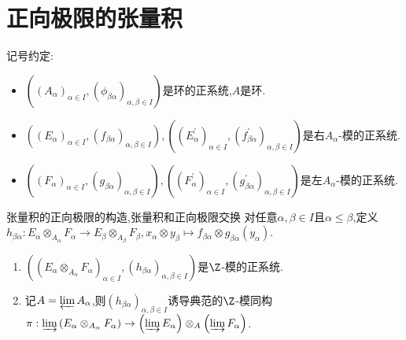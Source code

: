 \section{正向极限的张量积}

记号约定:
\begin{itemize}
	\item $\left(\left(A_{\alpha}\right)_{\alpha\in I},\left(\phi_{\beta\alpha}\right)_{\alpha,\beta\in I}\right)$是环的正系统,$A$是环.
	\item $\left(\left(E_{\alpha}\right)_{\alpha\in I},\left(f_{\beta\alpha}\right)_{\alpha,\beta\in I}\right),\left(\left(E_{\alpha}^{\prime}\right)_{\alpha\in I},\left(f_{\beta\alpha}^{\prime}\right)_{\alpha,\beta\in I}\right)$是右$A_{\alpha}$-模的正系统.
	\item $\left(\left(F_{\alpha}\right)_{\alpha\in I},\left(g_{\beta\alpha}\right)_{\alpha,\beta\in I}\right),\left(\left(F_{\alpha}^{\prime}\right)_{\alpha\in I},\left(g_{\beta\alpha}^{\prime}\right)_{\alpha,\beta\in I}\right)$是左$A_{\alpha}$-模的正系统.
\end{itemize}

\begin{proposition}{张量积的正向极限的构造,张量积和正向极限交换}{}
	对任意$\alpha,\beta\in I$且$\alpha\leq\beta$,定义$h_{\beta\alpha}:E_{\alpha}\otimes_{A_{\alpha}}F_{\alpha}\to E_{\beta}\otimes_{A_{\beta}}F_{\beta},x_{\alpha}\otimes y_{\beta}\mapsto f_{\beta\alpha}\otimes g_{\beta\alpha}\left(y_{\alpha}\right)$.
	\begin{enumerate}
		\item $\left(\left(E_{\alpha}\otimes_{A_{\alpha}}F_{\alpha}\right)_{\alpha\in I},\left(h_{\beta\alpha}\right)_{\alpha,\beta\in I}\right)$是$\Z$-模的正系统.
		\item 记$A=\varprojlim A_{\alpha}$,则$\left(h_{\beta\alpha}\right)_{\alpha,\beta\in I}$诱导典范的$\Z$-模同构$\pi:\varinjlim\left(E_{\alpha}\otimes_{A_{\alpha}}F_{\alpha}\right)\to\left(\varinjlim E_{\alpha}\right)\otimes_{A}\left(\varinjlim F_{\alpha}\right)$.
	\end{enumerate}
\end{proposition}

